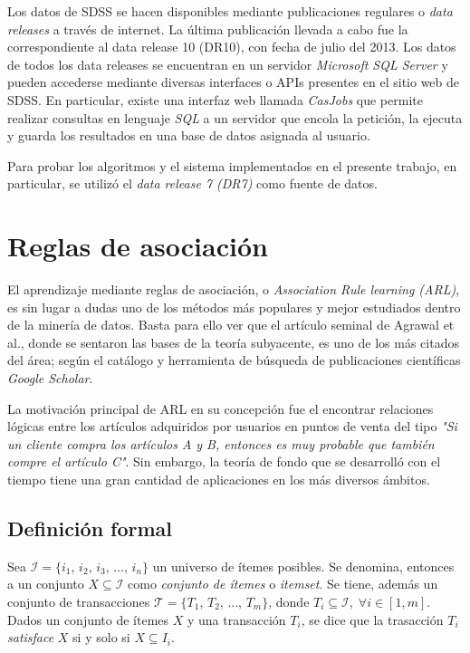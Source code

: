 Los datos de SDSS se hacen disponibles mediante publicaciones regulares o \textit{data releases} a través de internet. La última publicación llevada a cabo fue la correspondiente al data release 10 (DR10), con fecha de julio del 2013. Los datos de todos los data releases se encuentran en un servidor \textit{Microsoft SQL Server} y pueden accederse mediante diversas interfaces o APIs presentes en el sitio web de SDSS. En particular, existe una interfaz web llamada \textit{CasJobs} que permite realizar consultas en lenguaje \textit{SQL} a un servidor que encola la petición, la ejecuta y guarda los resultados en una base de datos asignada al usuario.

Para probar los algoritmos y el sistema implementados en el presente trabajo, en particular, se utilizó el \textit{data release 7 (DR7)} como fuente de datos.

\section{Reglas de asociación}

El aprendizaje mediante reglas de asociación, o \textit{Association Rule learning (ARL)}, es sin lugar a dudas uno de los métodos más populares y mejor estudiados dentro de la minería de datos. Basta para ello ver que el artículo seminal de Agrawal et al.\cite{agrawal1993mining}, donde se sentaron las bases de la teoría subyacente, es uno de los más citados del área; según el catálogo y herramienta de búsqueda de publicaciones científicas \textit{Google Scholar}.

La motivación principal de ARL en su concepción fue el encontrar relaciones lógicas entre los artículos adquiridos por usuarios en puntos de venta del tipo \textit{"Si un cliente compra los artículos A y B, entonces es muy probable que también compre el artículo C"}. Sin embargo, la teoría de fondo que se desarrolló con el tiempo tiene una gran cantidad de aplicaciones en los más diversos ámbitos.

\subsection{Definición formal}

Sea $\mathcal{I} = \{i_1,\,i_2,\,i_3,\,\ldots ,\,i_n\}$ un universo de ítemes posibles. Se denomina, entonces a un conjunto $X \subseteq \mathcal{I}$ como \textit{conjunto de ítemes} o \textit{itemset}. Se tiene, además un conjunto de transacciones $\mathcal{T} = \{T_1,\,T_2,\,\ldots,\,T_m\}$, donde $T_i \subseteq \mathcal{I}, \; \forall i \in {[1,m]}$. Dados un conjunto de ítemes $X$ y una transacción $T_i$, se dice que la trasacción $T_i$ \textit{satisface} $X$ si y solo si $X \subseteq I_i$.

